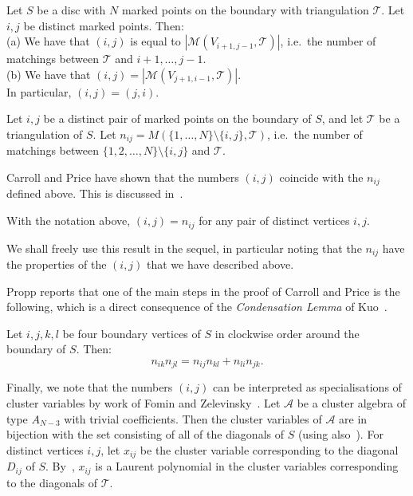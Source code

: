 \documentclass[a4paper]{amsart}
\begin{document}
\begin{theorem} \cite[Theorem 1]{bci74} \label{thm:broline}
Let $S$ be a disc with $N$ marked points on the boundary
with triangulation ${\mathcal T}$.
Let $i,j$ be distinct marked points.
Then: \\
(a) We have that $(i,j)$ is equal to $|{\mathcal M}(V_{i+1,j-1},{\mathcal T})|$, i.e.\ 
the number of matchings between ${\mathcal T}$ and $i+1,\ldots ,j-1$.\\
(b) We have that $(i,j)=|{\mathcal M}(V_{j+1,i-1},{\mathcal T})|$. \\
In particular, $(i,j)=(j,i)$.
\end{theorem}

\begin{definition}
Let $i,j$ be a distinct pair of marked points on the boundary of $S$,
and let ${\mathcal T}$ be a triangulation of $S$.
Let $n_{ij}=M(\{1,\dots,N\}\setminus\{i,j\},{\mathcal T})$, i.e.\ 
the number of matchings between
$\{1,2,\dots,N\}\setminus\{i,j\}$ and ${\mathcal T}$.
\end{definition}

Carroll and Price have shown that the numbers
$(i,j)$ coincide with the $n_{ij}$ defined above. This is discussed
in~\cite{propp}.

\begin{theorem} \cite{carrollprice} \label{thm:bracketequalsn}
With the notation above, $(i,j)=n_{ij}$ for any pair of distinct
vertices $i,j$.
\end{theorem}

We shall freely use this result in the sequel, in particular noting
that the $n_{ij}$ have the properties of the $(i,j)$ that we have
described above.

Propp reports that one of the main steps in the proof of Carroll and
Price is the following, which is a direct consequence of
the \emph{Condensation Lemma} of Kuo~\cite[Theorem 2.5]{kuo04}.

\begin{prop} \label{prop:unpuncturedmesh}
Let $i,j,k,l$ be four boundary vertices of $S$ in clockwise order around the
boundary of $S$. Then:
$$n_{ik}n_{jl}=n_{ij}n_{kl}+n_{li}n_{jk}.$$
\end{prop}

Finally, we note that the numbers $(i,j)$ can be interpreted as
specialisations of cluster variables by work of Fomin and
Zelevinsky~\cite[12.2]{fominzelevinsky03}. Let $\mathcal{A}$ be a cluster
algebra of type $A_{N-3}$ with trivial coefficients. Then the cluster
variables of $\mathcal{A}$ are in bijection with the set consisting of
all of the diagonals of $S$ (using also~\cite{fominzelevinsky01}).
For distinct vertices $i,j$, let $x_{ij}$ be the cluster variable
corresponding to the diagonal $D_{ij}$ of $S$.
By~\cite[3.1]{fominzelevinsky02}, $x_{ij}$ is
a Laurent polynomial in the cluster variables corresponding to the diagonals
of ${\mathcal T}$.
\end{document}
